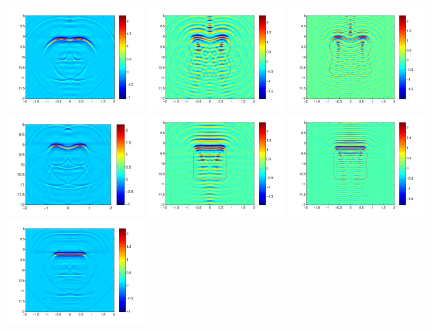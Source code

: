 \documentclass[12pt]{iopart}
\begin{document}
{\begin{figure}
	\includegraphics[width=0.32\textwidth]{./graphic/peanut-eps-converted-to.pdf}
	\includegraphics[width=0.32\textwidth]{./graphic/p_leaf_3pi-eps-converted-to.pdf}
	\includegraphics[width=0.32\textwidth]{./graphic/p_leaf_5pi-eps-converted-to.pdf}
	\includegraphics[width=0.32\textwidth]{./graphic/p_leaf-eps-converted-to.pdf}
	\includegraphics[width=0.32\textwidth]{./graphic/rectangle_3pi-eps-converted-to.pdf}
	\includegraphics[width=0.32\textwidth]{./graphic/rectangle_5pi-eps-converted-to.pdf}
	\includegraphics[width=0.32\textwidth]{./graphic/rectangle-eps-converted-to.pdf}
	

\end{figure}}
\end{document}

